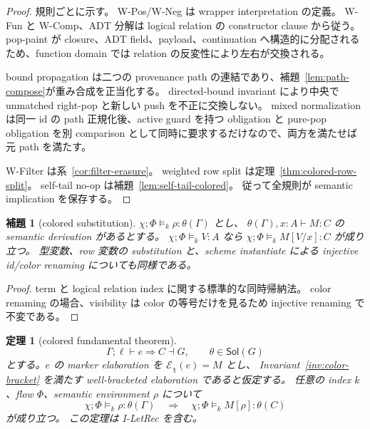 \documentclass[uplatex,dvipdfmx,a4paper,10.5pt]{jsarticle}
\theoremstyle{jpplain}
\newtheorem{lemma}[definition]{補題}
\newtheorem{theorem}[definition]{定理}
\newcommand{\sol}{\mathsf{Sol}}
\newcommand{\Elab}{\mathcal E}
\begin{document}
\begin{proof}
規則ごとに示す。
W-Pos/W-Neg は wrapper interpretation の定義。
W-Fun と W-Comp、ADT 分解は logical relation の constructor clause から従う。
pop-paint が closure、ADT field、payload、continuation へ構造的に分配されるため、function domain では relation の反変性により左右が交換される。

bound propagation は二つの provenance path の連結であり、補題~\ref{lem:path-compose}が重み合成を正当化する。
directed-bound invariant により中央で unmatched right-pop と新しい push を不正に交換しない。
mixed normalization は同一 id の path 正規化後、active guard を持つ obligation と pure-pop obligation を別 comparison として同時に要求するだけなので、両方を満たせば元 path を満たす。

W-Filter は系~\ref{cor:filter-erasure}。
weighted row split は定理~\ref{thm:colored-row-split}。
self-tail no-op は補題~\ref{lem:self-tail-colored}。
従って全規則が semantic implication を保存する。
\end{proof}

\begin{lemma}[colored substitution]
$\chi;\Phi\models_k\rho:\theta(\Gamma)$ とし、
$\theta(\Gamma),x:A\vdash M:C$ の semantic derivation があるとする。
$\chi;\Phi\models_k V:A$ なら
$\chi;\Phi\models_k M[V/x]:C$ が成り立つ。
型変数、row 変数の substitution と、scheme instantiate による injective id/color renaming についても同様である。
\end{lemma}

\begin{proof}
term と logical relation index に関する標準的な同時帰納法。
color renaming の場合、visibility は color の等号だけを見るため injective renaming で不変である。
\end{proof}

\begin{theorem}[colored fundamental theorem]\label{thm:colored-fundamental}
\[
  \Gamma;\ell\vdash e\Rightarrow C\dashv G,
  \qquad \theta\in\sol(G)
\]
とする。$e$ の marker elaboration を $\Elab_{\chi}(e)=M$ とし、
Invariant~\ref{inv:color-bracket} を満たす well-bracketed elaboration であると仮定する。
任意の index $k$、flow $\Phi$、semantic environment $\rho$ について
\[
  \chi;\Phi\models_k\rho:\theta(\Gamma)
  \quad\Longrightarrow\quad
  \chi;\Phi\models_k M[\rho]:\theta(C)
\]
が成り立つ。
この定理は I-LetRec を含む。
\end{theorem}
\end{document}
